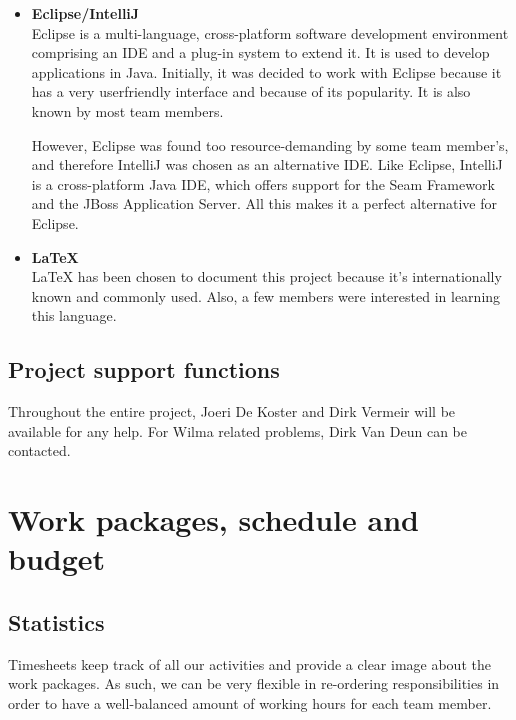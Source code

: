 \documentclass[salesmen, twoside]{../../../templates/latex/2009/softproj}
\begin{document}
\begin{projdoc}
\begin{itemize}
				\item \textbf{Eclipse/IntelliJ} \\
				Eclipse is a multi-language, cross-platform software development environment comprising an IDE 
				and a plug-in system to extend it. It is used to develop applications in 
				Java. Initially, it was decided to work with Eclipse because 
				it has a very userfriendly interface and because of its popularity. It is also
				known by most team members. 
				
				However, Eclipse was found too resource-demanding by some team member's, and therefore 
				IntelliJ was chosen as an alternative IDE.
				Like Eclipse, IntelliJ is a cross-platform Java IDE, which offers support for
				the Seam Framework and the JBoss Application Server. All this makes it a 
				perfect alternative for Eclipse.
				
				\item \textbf{\LaTeX} \\
				 \LaTeX{} has been chosen to document this project because it's 
				internationally known and commonly used. Also, a few members 
				were interested in learning this language.
				
			\end{itemize}	
			
			\section{Project support functions}
			
			Throughout the entire project, Joeri De Koster and Dirk Vermeir will 
			be available for any help. For Wilma related problems, Dirk Van Deun 
			can be contacted.
			
	
	\chapter{Work packages, schedule and budget}
	
			\section{Statistics}
			
			Timesheets keep track of all our activities and provide a clear image about the work packages. 
			As such, we can be very flexible in re-ordering responsibilities in order to have a well-balanced amount of
			working hours for each team member. \\
			

\end{projdoc}
\end{document}
